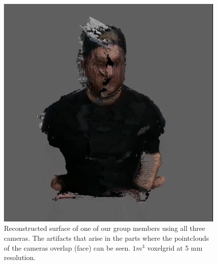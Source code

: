\documentclass[10pt,twocolumn,letterpaper]{article}
\begin{document}
\begin{figure}[h!]
	\begin{center}
		\includegraphics[width=0.9\linewidth]{imgs/res3}
	\end{center}
	\caption{Reconstructed surface of one of our group members using all three cameras. The artifacts that arise in the parts where the pointclouds of the cameras overlap (face) can be seen. $1m^3$ voxelgrid at 5 mm resolution.}
	\label{fig:reconstruction-all-cameras}
\end{figure}
\end{document}
